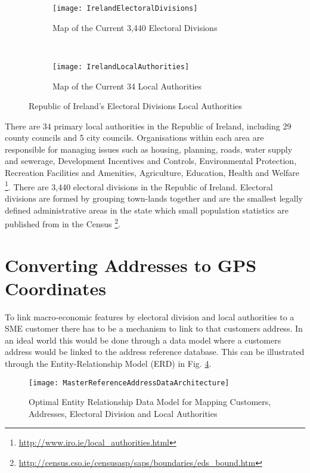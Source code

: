 \begin{figure}[H]
	\begin{subfigure}[b]{0.5\textwidth}
		\captionsetup{font=scriptsize}
		\texttt{[image: IrelandElectoralDivisions]}
		\caption{Map of the Current 3,440 Electoral Divisions}\label{fig:IrelandElectoralDivisions}
	\end{subfigure} ~\quad
	\begin{subfigure}[b]{0.5\textwidth}
		\captionsetup{font=scriptsize}
		\texttt{[image: IrelandLocalAuthorities]}
		\caption{Map of the Current 34 Local Authorities}\label{fig:IrelandLocalAuthorities}
	\end{subfigure}
	\caption{Republic of Ireland's Electoral Divisions Local Authorities}
	\label{fig:Ireland_ED_LA_Example}
\end{figure}

There are 34 primary local authorities in the Republic of Ireland, including 29 county councils and 5 city councils. Organisations within each area are responsible for managing issues such as housing, planning, roads, water supply and sewerage, Development Incentives and Controls, Environmental Protection, Recreation Facilities and Amenities, Agriculture, Education, Health and Welfare \footnote{\url{http://www.iro.ie/local_authorities.html}}. There are 3,440 electoral divisions in the Republic of Ireland. Electoral divisions are formed by grouping town-lands together and are the smallest legally defined administrative areas in the state which small population statistics are published from in the Census \footnote{\url{http://census.cso.ie/censusasp/saps/boundaries/eds_bound.htm}}.


\section{Converting Addresses to GPS Coordinates}
To link macro-economic features by electoral division and local authorities to a SME customer there has to be a mechanism to link to that customers address. In an ideal world this would be done through a data model where a customers address would be linked to the address reference database. This can be illustrated through the Entity-Relationship Model (ERD) in Fig. \ref{fig:MasterReferenceAddressDataArchitecture}.

\begin{figure}[H]
	\texttt{[image: MasterReferenceAddressDataArchitecture]}
	\caption{Optimal Entity Relationship Data Model for Mapping Customers, Addresses, Electoral Division and Local Authorities}
	\label{fig:MasterReferenceAddressDataArchitecture}
\end{figure}

